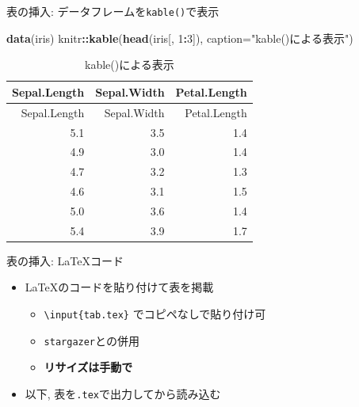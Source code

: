 \documentclass[
  12pt,
  ignorenonframetext,
]{beamer}
\newenvironment{Shaded}{\begin{snugshade}}{\end{snugshade}}
\newcommand{\DataTypeTok}[1]{\textcolor[rgb]{0.13,0.29,0.53}{#1}}
\newcommand{\DecValTok}[1]{\textcolor[rgb]{0.00,0.00,0.81}{#1}}
\newcommand{\KeywordTok}[1]{\textcolor[rgb]{0.13,0.29,0.53}{\textbf{#1}}}
\newcommand{\NormalTok}[1]{#1}
\newcommand{\OperatorTok}[1]{\textcolor[rgb]{0.81,0.36,0.00}{\textbf{#1}}}
\newcommand{\StringTok}[1]{\textcolor[rgb]{0.31,0.60,0.02}{#1}}
\providecommand{\tightlist}{%
  \setlength{\itemsep}{0pt}\setlength{\parskip}{0pt}}
\begin{document}
\begin{frame}[fragile]{表の挿入: データフレームを\texttt{kable()}で表示}
\protect\hypertarget{ux8868ux306eux633fux5165-ux30c7ux30fcux30bfux30d5ux30ecux30fcux30e0ux3092kableux3067ux8868ux793a}{}

\begin{Shaded}
\begin{Highlighting}[]
\KeywordTok{data}\NormalTok{(iris)}
\NormalTok{knitr}\OperatorTok{::}\KeywordTok{kable}\NormalTok{(}\KeywordTok{head}\NormalTok{(iris[, }\DecValTok{1}\OperatorTok{:}\DecValTok{3}\NormalTok{]),}
             \DataTypeTok{caption=}\StringTok{"kable()による表示"}\NormalTok{)}
\end{Highlighting}
\end{Shaded}

\begin{longtable}[]{@{}rrr@{}}
\caption{kable()による表示}\tabularnewline
\toprule
Sepal.Length & Sepal.Width & Petal.Length\tabularnewline
\midrule
\endfirsthead
\toprule
Sepal.Length & Sepal.Width & Petal.Length\tabularnewline
\midrule
\endhead
5.1 & 3.5 & 1.4\tabularnewline
4.9 & 3.0 & 1.4\tabularnewline
4.7 & 3.2 & 1.3\tabularnewline
4.6 & 3.1 & 1.5\tabularnewline
5.0 & 3.6 & 1.4\tabularnewline
5.4 & 3.9 & 1.7\tabularnewline
\bottomrule
\end{longtable}

\end{frame}

\begin{frame}[fragile]{表の挿入: \LaTeX コード}
\protect\hypertarget{ux8868ux306eux633fux5165-ux30b3ux30fcux30c9}{}

\begin{itemize}
\tightlist
\item
  \LaTeX のコードを貼り付けて表を掲載

  \begin{itemize}
  \tightlist
  \item
    \texttt{\textbackslash{}input\{tab.tex\}} でコピペなしで貼り付け可
  \item
    \texttt{stargazer}との併用
  \item
    \textbf{リサイズは手動で}
  \end{itemize}
\item
  以下, 表を\texttt{.tex}で出力してから読み込む
\end{itemize}

\begin{Shaded}
\end{Shaded}



\end{frame}
\end{document}
